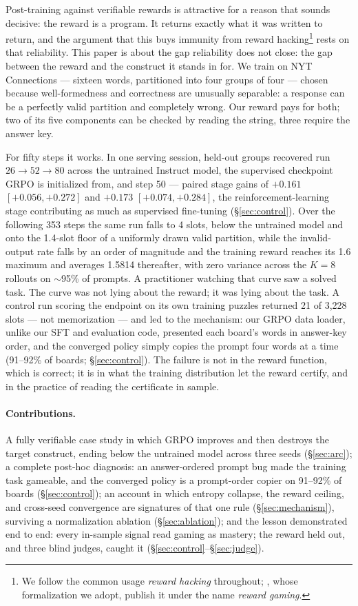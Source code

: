 \documentclass{article}
\begin{document}
Post-training against verifiable rewards is attractive for a reason that
sounds decisive: the reward is a program. It returns exactly what it was
written to return, and the argument that this
buys immunity from reward hacking\footnote{We follow the common usage
\emph{reward hacking} throughout; \citet{skalse2022}, whose formalization we
adopt, publish it under the name \emph{reward gaming}.} rests on that
reliability. This paper is about the gap reliability does not close: the gap
between the reward and the construct it stands in for. We train on NYT
Connections --- sixteen words, partitioned into four groups of four ---
chosen because well-formedness and correctness are unusually separable: a
response can be a perfectly valid partition and completely wrong. Our
reward pays for both; two of its five components can be checked by reading
the string, three require the answer key.

For fifty steps it works. In one serving session, held-out groups
recovered run $26 \rightarrow 52 \rightarrow 80$ across the untrained
Instruct model, the supervised checkpoint GRPO is initialized from, and
step 50 --- paired stage gains of $+0.161$ $[+0.056, +0.272]$ and $+0.173$
$[+0.074, +0.284]$, the reinforcement-learning stage contributing as much
as supervised fine-tuning (\S\ref{sec:control}). Over the following
353 steps the same run falls to 4 slots, below the untrained model and onto
the 1.4-slot floor of a uniformly drawn valid partition, while
the invalid-output rate falls by an order of magnitude and the training
reward reaches its 1.6 maximum and averages 1.5814 thereafter, with
zero variance across the $K=8$ rollouts on $\sim$95\% of prompts. A
practitioner watching that curve saw a solved task. The curve was not lying
about the reward; it was lying about the task. A control run scoring the
endpoint on its own training puzzles returned 21 of 3{,}228 slots --- not
memorization --- and led to the mechanism: our GRPO data loader, unlike our
SFT and evaluation code, presented each board's words in answer-key order,
and the converged policy simply copies the prompt four words at a time
(91--92\% of boards; \S\ref{sec:control}). The failure is not in the reward
function, which is correct; it is in what the training distribution let
the reward certify, and in the practice of reading the certificate in
sample.

\paragraph{Contributions.} A fully verifiable case study in which GRPO
improves and then destroys the target construct, ending below the untrained
model across three seeds (\S\ref{sec:arc}); a complete post-hoc diagnosis:
an answer-ordered prompt bug made the training task gameable, and the
converged policy is a prompt-order copier on 91--92\% of boards
(\S\ref{sec:control}); an account in which entropy collapse, the reward
ceiling, and cross-seed convergence are signatures of that one rule
(\S\ref{sec:mechanism}), surviving a
normalization ablation (\S\ref{sec:ablation}); and the lesson demonstrated
end to end: every in-sample signal read gaming as mastery; the reward held
out, and three blind judges, caught it
(\S\ref{sec:control}--\S\ref{sec:judge}).
\end{document}
